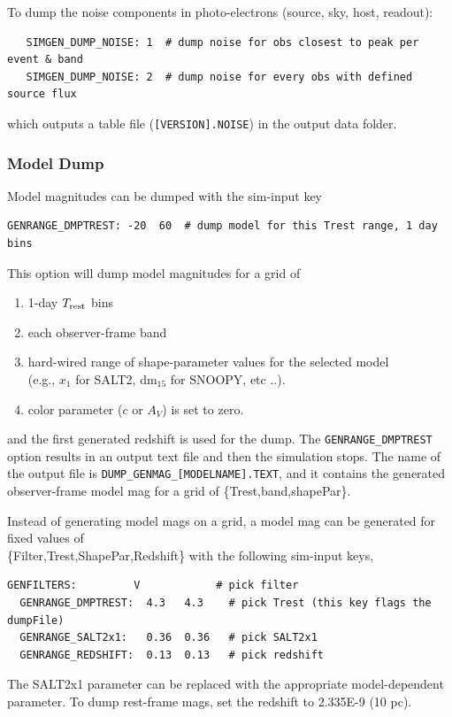 \documentclass[12pt]{article}
\newcommand{\Trest}{T_{\rm rest}}
\begin{document}
\medskip\noindent
To dump the noise components in photo-electrons (source, sky, host, readout):
\begin{verbatim}  
   SIMGEN_DUMP_NOISE: 1  # dump noise for obs closest to peak per event & band
   SIMGEN_DUMP_NOISE: 2  # dump noise for every obs with defined source flux
\end{verbatim}
which outputs a table file ({\tt [VERSION].NOISE}) in the output data folder.

   \subsubsection{ Model Dump }
   \label{sssec:model_dump}

Model magnitudes can be dumped with the sim-input key
\begin{Verbatim}[frame=single]
  GENRANGE_DMPTREST: -20  60  # dump model for this Trest range, 1 day bins
\end{Verbatim}
%
This option will dump model magnitudes for a grid of
\begin{enumerate}
 \item 1-day $\Trest$ bins
 \item each observer-frame band
 \item hard-wired range of shape-parameter values for the
   selected model \\ 
   (e.g., $x_1$ for SALT2, dm$_{15}$ for SNOOPY, etc ..).
 \item color parameter ($c$ or $A_V$) is set to zero.
\end{enumerate}
%
and the first generated redshift is used for the dump.
The {\tt GENRANGE\_DMPTREST} option results in an output
text file and then the simulation stops. The name of the 
output file is {\tt DUMP\_GENMAG\_[MODELNAME].TEXT},
and it contains the generated observer-frame model mag for 
a grid of \{Trest,band,shapePar\}. 

 
Instead of generating model mags on a grid,
a model mag can be generated for fixed values of \\ 
\{Filter,Trest,ShapePar,Redshift\} with the following
sim-input keys,
%
\begin{Verbatim}[frame=single]
  GENFILTERS:         V            # pick filter
  GENRANGE_DMPTREST:  4.3   4.3    # pick Trest (this key flags the dumpFile)
  GENRANGE_SALT2x1:   0.36  0.36   # pick SALT2x1
  GENRANGE_REDSHIFT:  0.13  0.13   # pick redshift
\end{Verbatim}
%
The SALT2x1 parameter can be replaced with the appropriate
model-dependent parameter. To dump rest-frame mags,
set the redshift to 2.335E-9 (10 pc).
\end{document}
